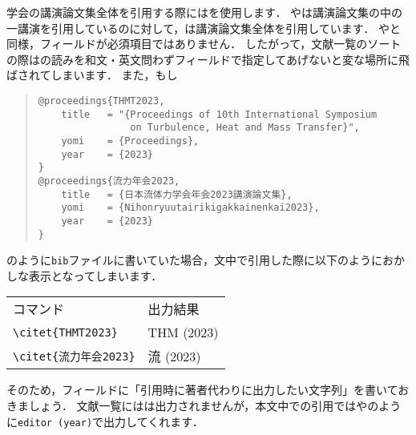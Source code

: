 \documentclass[a4paper,fleqn,uplatex,dvipdfmx]{jsarticle}
\begin{document}
学会の講演論文集全体を引用する際には\ttproceedings を使用します．
\hyperref[ssec:conference]{\ttconference}や\hyperref[ssec:inproceedings]{\ttinproceedings}は講演論文集の中の一講演を引用しているのに対して，\ttproceedings は講演論文集全体を引用しています．
\hyperref[ssec:manual]{\ttmanual}や\hyperref[ssec:misc]{\ttmisc}と同様，\ttauthor フィールドが必須項目ではありません．
したがって，文献一覧のソートの際は\tttitle の読みを和文・英文問わず\ttyomi フィールドで指定してあげないと変な場所に飛ばされてしまいます．
また，もし
\begin{quote}
\begin{verbatim}
@proceedings{THMT2023,
    title   = "{Proceedings of 10th International Symposium 
                on Turbulence, Heat and Mass Transfer}",
    yomi    = {Proceedings},
    year    = {2023}
}
@proceedings{流力年会2023,
    title   = {日本流体力学会年会2023講演論文集},
    yomi    = {Nihonryuutairikigakkainenkai2023},
    year    = {2023}
}
\end{verbatim}
\end{quote}
のように\verb|bib|ファイルに書いていた場合，文中で引用した際に以下のようにおかしな表示となってしまいます．
\begin{table}[h]
    \centering
    \begin{tabular}{ll}
        コマンド    &出力結果 \\
        \verb|\citet{THMT2023}| &THM (2023) \\
        \verb|\citet{流力年会2023}| &流 (2023) \\
    \end{tabular}
\end{table}
そのため，\tteditor フィールドに「引用時に著者代わりに出力したい文字列」を書いておきましょう．
文献一覧には\tteditor は出力されませんが，本文中での引用では\citet{THMT2023}や\citet{流力年会2023}のように\verb|editor (year)|で出力してくれます．
\end{document}
